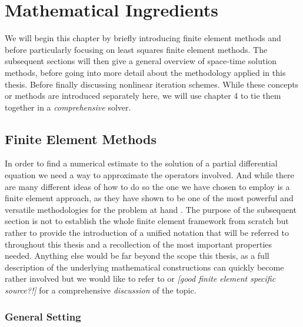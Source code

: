 \documentclass[../draft_1.tex]{subfiles}
\begin{document}
\chapter{Mathematical Ingredients}

We will begin this chapter by briefly introducing finite element methods and before particularly focusing on least squares finite element methods. The subsequent sections will then give a general overview of space-time solution methods, before going into more detail about the methodology applied in this thesis. Before finally discussing nonlinear iteration schemes. While these concepts or methods are introduced separately here, we will use chapter 4 to tie them together in a \textit{comprehensive} solver.


\section{Finite Element Methods}

In order to find a numerical estimate to the solution of a partial differential equation we need a way to approximate the operators involved. And while there are many different ideas of how to do so the one we have chosen to employ is a finite element approach, as they have shown to be one of the most powerful and versatile methodologies for the problem at hand \cite{bochev2009least}. The purpose of the subsequent section is not to establish the whole finite element framework from scratch but rather to provide the introduction of a unified notation that will be referred to throughout this thesis and a recollection of the most important properties needed. Anything else would be far beyond the scope this thesis, as a full description of the underlying mathematical constructions can quickly become rather involved but we would like to refer to \cite{evans2010partial} or \textit{[good finite element specific source?!]} for a comprehensive \textit{discussion} of the topic. 



\subsection{General Setting}
\end{document}
